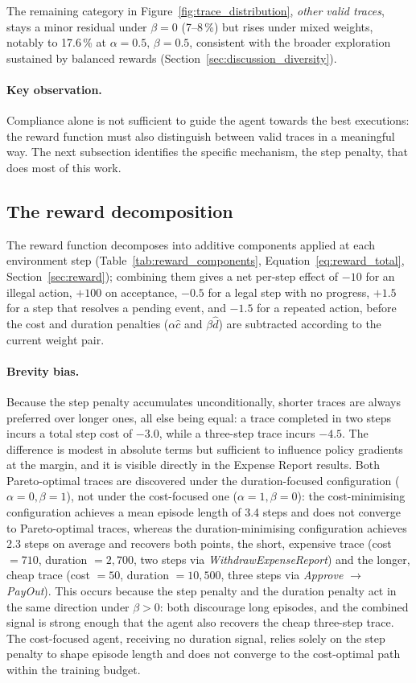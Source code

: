 The remaining category in Figure~\ref{fig:trace_distribution}, \emph{other valid traces}, stays a minor residual under $\beta=0$ (7--8\,\%) but rises under mixed weights, notably to 17.6\,\% at $\alpha=0.5,\,\beta=0.5$, consistent with the broader exploration sustained by balanced rewards (Section~\ref{sec:discussion_diversity}).


\paragraph{Key observation.} Compliance alone is not sufficient to guide the agent towards the best executions: the reward function must also distinguish between valid traces in a meaningful way. The next subsection identifies the specific mechanism, the step penalty, that does most of this work.

\subsection{The reward decomposition}

The reward function decomposes into additive components applied at each environment step (Table~\ref{tab:reward_components}, Equation~\ref{eq:reward_total}, Section~\ref{sec:reward}); combining them gives a net per-step effect of $-10$ for an illegal action, $+100$ on acceptance, $-0.5$ for a legal step with no progress, $+1.5$ for a step that resolves a pending event, and $-1.5$ for a repeated action, before the cost and duration penalties ($\alpha\hat{c}$ and $\beta\hat{d}$) are subtracted according to the current weight pair.

\paragraph{Brevity bias.} Because the step penalty accumulates unconditionally, shorter traces are always preferred over longer ones, all else being equal: a trace completed in two steps incurs a total step cost of $-3.0$, while a three-step trace incurs $-4.5$. The difference is modest in absolute terms but sufficient to influence policy gradients at the margin, and it is visible directly in the Expense Report results. Both Pareto-optimal traces are discovered under the duration-focused configuration ($\alpha=0, \beta=1$), not under the cost-focused one ($\alpha=1, \beta=0$): the cost-minimising configuration achieves a mean episode length of 3.4 steps and does not converge to Pareto-optimal traces, whereas the duration-minimising configuration achieves 2.3 steps on average and recovers both points, the short, expensive trace (cost $= 710$, duration $= 2{,}700$, two steps via \textit{WithdrawExpenseReport}) and the longer, cheap trace (cost $= 50$, duration $= 10{,}500$, three steps via \textit{Approve} $\to$ \textit{PayOut}). This occurs because the step penalty and the duration penalty act in the same direction under $\beta > 0$: both discourage long episodes, and the combined signal is strong enough that the agent also recovers the cheap three-step trace. The cost-focused agent, receiving no duration signal, relies solely on the step penalty to shape episode length and does not converge to the cost-optimal path within the training budget.

